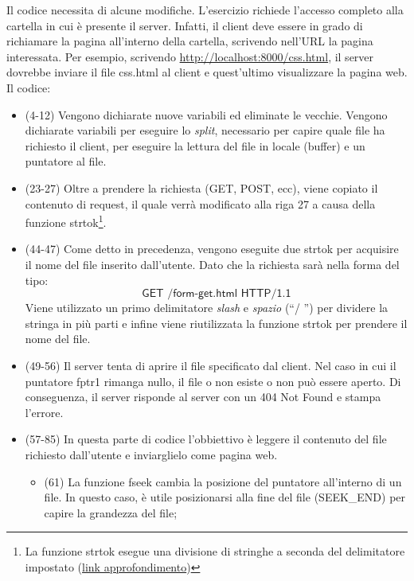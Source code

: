 \documentclass[a4paper]{article}
\newcommand{\dquotes}[1]{``#1''}
\begin{document}
	\noindent
	Il codice necessita di alcune modifiche. L'esercizio richiede l'accesso completo alla cartella in cui è presente il server. Infatti, il client deve essere in grado di richiamare la pagina all'interno della cartella, scrivendo nell'URL la pagina interessata. Per esempio, scrivendo \url{http://localhost:8000/css.html}, il server dovrebbe inviare il file \textsf{css.html} al client e quest'ultimo visualizzare la pagina web. Il codice:
	
	\begin{itemize}
		\item (4-12) Vengono dichiarate nuove variabili ed eliminate le vecchie. Vengono dichiarate variabili per eseguire lo \emph{split}, necessario per capire quale file ha richiesto il client, per eseguire la lettura del file in locale (\textsf{buffer}) e un puntatore al file.
		
		\item (23-27) Oltre a prendere la richiesta (GET, POST, ecc), viene copiato il contenuto di \textsf{request}, il quale verrà modificato alla riga 27 a causa della funzione \textsf{strtok}\footnote{La funzione \textsf{strtok} esegue una divisione di stringhe a seconda del delimitatore impostato (\href{https://www.tutorialspoint.com/c_standard_library/c_function_strtok.htm}{link approfondimento})}.
		
		\item (44-47) Come detto in precedenza, vengono eseguite due \textsf{strtok} per acquisire il nome del file inserito dall'utente. Dato che la richiesta sarà nella forma del tipo:
		\begin{equation*}
			\textsf{GET /form-get.html HTTP/1.1}
		\end{equation*}
		Viene utilizzato un primo delimitatore \emph{slash} e \emph{spazio} (\dquotes{\textsf{/ }}) per dividere la stringa in più parti e infine viene riutilizzata la funzione \textsf{strtok} per prendere il nome del file.
		
		\item (49-56) Il server tenta di aprire il file specificato dal client. Nel caso in cui il puntatore \textsf{fptr1} rimanga nullo, il file o non esiste o non può essere aperto. Di conseguenza, il server risponde al server con un \textsf{404 Not Found} e stampa l'errore.\newpage
		
		\item (57-85) In questa parte di codice l'obbiettivo è leggere il contenuto del file richiesto dall'utente e inviarglielo come pagina web.
		\begin{itemize}
			\item (61) La funzione \textsf{fseek} cambia la posizione del puntatore all'interno di un file. In questo caso, è utile posizionarsi alla fine del file (\textsf{SEEK\_END}) per capire la grandezza del file;
			

\end{itemize}
\end{itemize}
\end{document}
